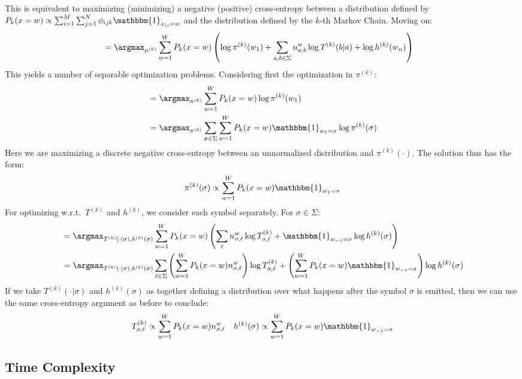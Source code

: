 This is equivalent to maximizing (minimizing) a negative (positive) cross-entropy between a distribution defined by $P_k(x = w) \propto \sum_{i=1}^M \sum_{j=1}^N \phi_{ijk}\mathbbm{1}_{x_{ij} = w}$ and the distribution defined by the $k$-th Markov Chain. Moving on:
\begin{align}
    &= \argmax_{\mu^{(k)}} \sum_{w=1}^W P_k(x = w) \left(\log \pi^{(k)}(w_1) + \sum_{a, b \in \Sigma} n_{a, b}^w \log T^{(k)}(b | a) + \log h^{(k)}(w_n)\right)
\end{align}
This yields a number of separable optimization problems. Considering first the optimization in $\pi^{(k)}$:
\begin{align}
    &= \argmax_{\pi^{(k)}} \sum_{w=1}^W P_k(x = w) \log \pi^{(k)}(w_1)\\
    &= \argmax_{\pi^{(k)}} \sum_{\sigma \in \Sigma} \sum_{w=1}^W P_k(x = w)\mathbbm{1}_{w_1 = \sigma} \log \pi^{(k)}(\sigma)
\end{align}
Here we are maximizing a discrete negative cross-entropy between an unnormalized distribution and $\pi^{(k)}(\cdot)$. The solution thus has the form:
\begin{align}
    \pi^{(k)}(\sigma) \propto \sum_{w=1}^W P_k(x = w)\mathbbm{1}_{w_1 = \sigma} 
\end{align}
For optimizing w.r.t.\ $T^{(k)}$ and $h^{(k)}$, we consider each symbol separately. For $\sigma \in \Sigma$:
\begin{align}
    &= \argmax_{T^{(k)}(\cdot | \sigma), h^{(k)}(\sigma)} \sum_{w=1}^W P_k(x = w) \left(\sum_{\ell} n_{\sigma,\ell}^w \log T^{(k)}_{\sigma, \ell} + \mathbbm{1}_{w_{-1}=\sigma}\log h^{(k)}(\sigma)\right)\\
    &= \argmax_{T^{(k)}(\cdot | \sigma), h^{(k)}(\sigma)} \sum_{\ell \in \Sigma} \left( \sum_{w=1}^W P_k(x = w)n^w_{\sigma,\ell}\right)\log T^{(k)}_{\sigma, \ell} + \left( \sum_{w=1}^W P_k(x = w)\mathbbm{1}_{w_{-1}=\sigma}\right)\log h^{(k)}(\sigma)
\end{align}
If we take $T^{(k)}(\cdot | \sigma)$ and $h^{(k)}(\sigma)$ as together defining a distribution over what happens after the symbol $\sigma$ is emitted, then we can use the same cross-entropy argument as before to conclude:
\begin{align}
    T^{(k)}_{\sigma, \ell} \propto \sum_{w=1}^W P_k(x = w)n_{\sigma,\ell}^w && h^{(k)}(\sigma) \propto \sum_{w=1}^W P_k(x = w)\mathbbm{1}_{w_{-1}=\sigma}
\end{align}

\subsection{Time Complexity}
